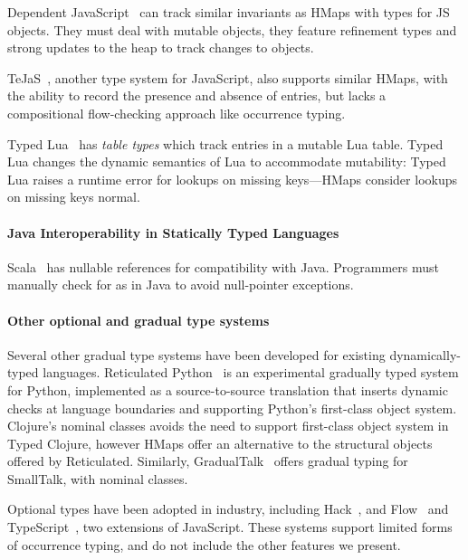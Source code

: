 Dependent JavaScript~\cite{Chugh:2012:DTJ} can track similar
invariants as HMaps with types for JS objects. They must deal with
mutable objects, they feature refinement types and strong updates to
the heap to track changes to objects.

TeJaS~\cite{TeJaS}, another type system for JavaScript,
also supports similar HMaps, with the ability to
record the presence and absence of entries, but lacks a compositional
flow-checking approach like occurrence typing.

Typed Lua~\cite{Maidl:2014:TLO} has \emph{table types} which track
entries in a mutable Lua table.  Typed Lua changes the dynamic
semantics of Lua to accommodate mutability: Typed Lua raises a runtime
error for lookups on missing keys---HMaps consider lookups on missing
keys normal.

\paragraph{Java Interoperability in Statically Typed Languages}
Scala~\cite{OCD+} has nullable references for compatibility with Java.
Programmers must manually check for
 as in Java to avoid null-pointer exceptions. 


\paragraph{Other optional and gradual type systems}
Several other gradual type
systems have been developed for existing
dynamically-typed languages.  Reticulated Python~\cite{Vitousek14} is
an experimental gradually typed system for Python, implemented as a
source-to-source translation that inserts dynamic checks at language
boundaries and supporting Python's first-class object system. 
Clojure's nominal classes avoids the need to support
first-class object system in Typed Clojure, however HMaps offer an alternative to
the structural objects offered by Reticulated. Similarly,
GradualTalk~\cite{gradualtalk} offers gradual typing for SmallTalk,
with nominal classes.

Optional types
have been  adopted in industry, including Hack~\cite{hack}, and Flow~\cite{flow} and
TypeScript~\cite{typescript}, two extensions of JavaScript. These
systems  support  limited forms of occurrence typing,
and do not include the other features we
present.



